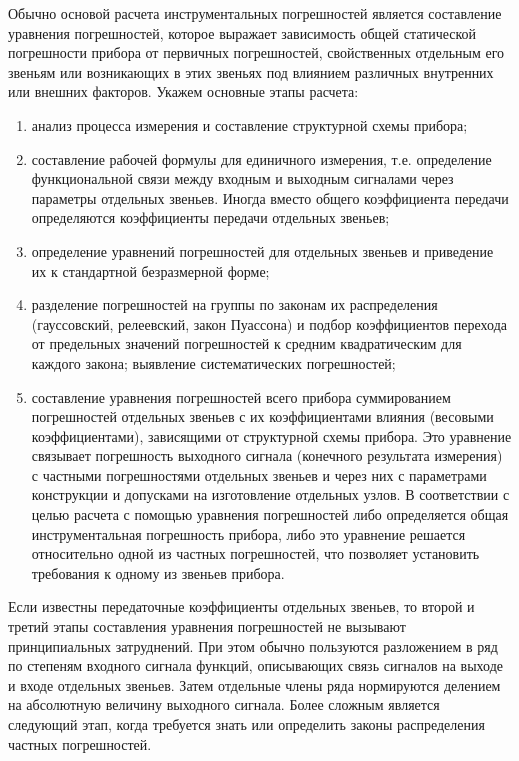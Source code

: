 Обычно основой расчета инструментальных погрешностей является составление уравнения погрешностей, которое выражает зависимость общей статической погрешности прибора от первичных погрешностей, свойственных отдельным его звеньям или возникающих в этих звеньях под влиянием различных внутренних или внешних факторов. Укажем основные этапы расчета:
\begin{enumerate}
\item анализ процесса измерения и составление структурной схемы прибора;
\item составление рабочей формулы для единичного измерения, т.е. определение функциональной связи между входным и выходным сигналами через параметры отдельных звеньев. Иногда вместо общего коэффициента передачи определяются коэффициенты передачи отдельных звеньев;
\item определение уравнений погрешностей для отдельных звеньев и приведение их к стандартной безразмерной форме;
\item разделение погрешностей на группы по законам их распределения (гауссовский, релеевский, закон Пуассона) и подбор коэффициентов перехода от предельных значений погрешностей к средним квадратическим для каждого закона; выявление систематических погрешностей;
\item составление уравнения погрешностей всего прибора суммированием погрешностей отдельных звеньев с их коэффициентами влияния (весовыми коэффициентами), зависящими от структурной схемы прибора. Это уравнение связывает погрешность выходного сигнала (конечного результата измерения) с частными погрешностями отдельных звеньев и через них с параметрами конструкции и допусками на изготовление отдельных узлов. В соответствии с целью расчета с помощью уравнения погрешностей либо определяется общая инструментальная погрешность прибора, либо это уравнение решается относительно одной из частных погрешностей, что позволяет установить требования к одному из звеньев прибора.
\end{enumerate}

Если известны передаточные коэффициенты отдельных звеньев, то второй и третий этапы составления уравнения погрешностей не вызывают принципиальных затруднений. При этом обычно пользуются разложением в ряд по степеням входного сигнала функций, описывающих связь сигналов на выходе и входе отдельных звеньев. Затем отдельные члены ряда нормируются делением на абсолютную величину выходного сигнала. Более сложным является следующий этап, когда требуется знать или определить законы распределения частных погрешностей.

